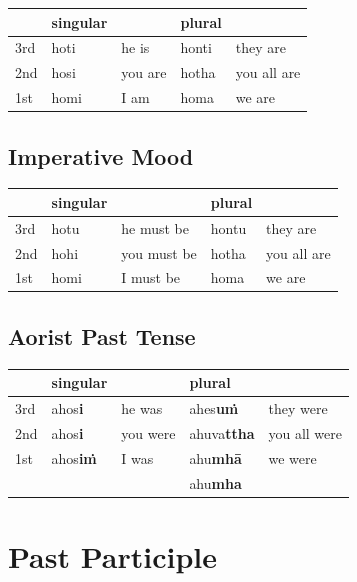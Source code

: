 \documentclass[11pt,oneside]{memoir}
\begin{document}
\begin{center}
\begin{tabular}{lllll}
 & singular &  & plural & \\[0pt]
\hline
3rd & hoti & he is & honti & they are\\[0pt]
2nd & hosi & you are & hotha & you all are\\[0pt]
1st & homi & I am & homa & we are\\[0pt]
\end{tabular}
\end{center}

\subsection{Imperative Mood}
\label{sec:org07c261b}

\begin{center}
\begin{tabular}{lllll}
 & singular &  & plural & \\[0pt]
\hline
3rd & hotu & he must be & hontu & they are\\[0pt]
2nd & hohi & you must be & hotha & you all are\\[0pt]
1st & homi & I must be & homa & we are\\[0pt]
\end{tabular}
\end{center}

\subsection{Aorist Past Tense}
\label{sec:orgf557567}

\begin{center}
\begin{tabular}{lllll}
 & singular &  & plural & \\[0pt]
\hline
3rd & ahos\textbf{i} & he was & ahes\textbf{uṁ} & they were\\[0pt]
2nd & ahos\textbf{i} & you were & ahuva\textbf{ttha} & you all were\\[0pt]
1st & ahos\textbf{iṁ} & I was & ahu\textbf{mhā} & we were\\[0pt]
 &  &  & ahu\textbf{mha} & \\[0pt]
\end{tabular}
\end{center}

\clearpage

\section{Past Participle}
\label{sec:org651fea7}
\end{document}
